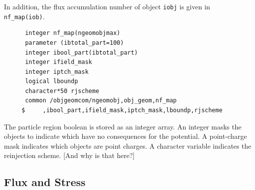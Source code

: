 \documentclass[12pt]{article}
\begin{document}
In addition, the flux accumulation number of object \verb!iobj! is
given in \verb!nf_map(iob)!.
\begin{verbatim}
      integer nf_map(ngeomobjmax)
      parameter (ibtotal_part=100)
      integer ibool_part(ibtotal_part)
      integer ifield_mask
      integer iptch_mask
      logical lboundp
      character*50 rjscheme
      common /objgeomcom/ngeomobj,obj_geom,nf_map
     $     ,ibool_part,ifield_mask,iptch_mask,lboundp,rjscheme
\end{verbatim}

The particle region boolean is stored as an integer array. An integer
masks the objects to indicate which have no consequences for the
potential. A point-charge mask indicates which objects are point
charges. A character variable indicates the reinjection scheme. [And
  why is that here?]

\subsection{Flux and Stress}\label{fluxstruct}
\end{document}

